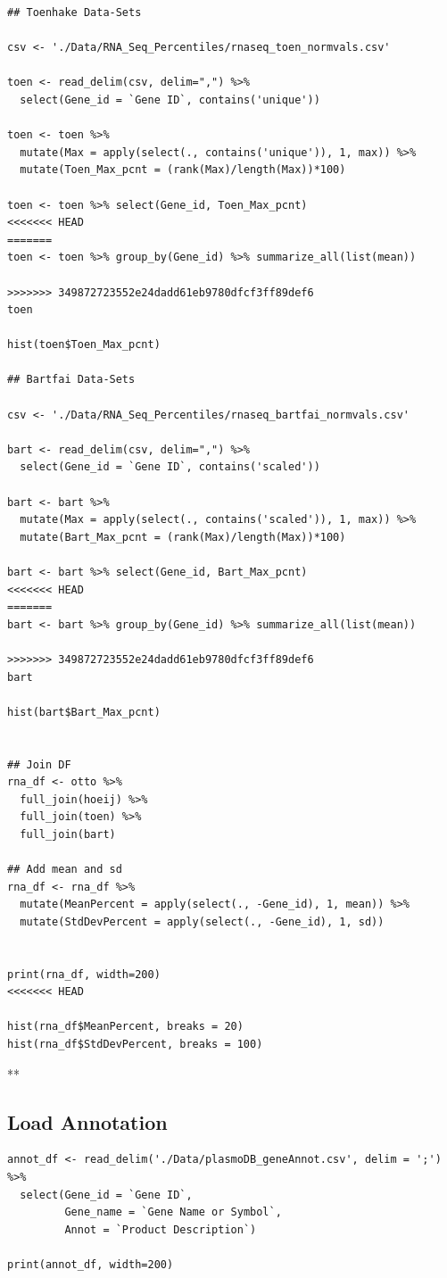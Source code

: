 \documentclass[11pt]{article}
\begin{document}
\begin{verbatim}
## Toenhake Data-Sets

csv <- './Data/RNA_Seq_Percentiles/rnaseq_toen_normvals.csv'

toen <- read_delim(csv, delim=",") %>%
  select(Gene_id = `Gene ID`, contains('unique'))

toen <- toen %>%
  mutate(Max = apply(select(., contains('unique')), 1, max)) %>%
  mutate(Toen_Max_pcnt = (rank(Max)/length(Max))*100)

toen <- toen %>% select(Gene_id, Toen_Max_pcnt)
<<<<<<< HEAD
=======
toen <- toen %>% group_by(Gene_id) %>% summarize_all(list(mean))

>>>>>>> 349872723552e24dadd61eb9780dfcf3ff89def6
toen

hist(toen$Toen_Max_pcnt)

## Bartfai Data-Sets

csv <- './Data/RNA_Seq_Percentiles/rnaseq_bartfai_normvals.csv'

bart <- read_delim(csv, delim=",") %>%
  select(Gene_id = `Gene ID`, contains('scaled'))

bart <- bart %>%
  mutate(Max = apply(select(., contains('scaled')), 1, max)) %>%
  mutate(Bart_Max_pcnt = (rank(Max)/length(Max))*100)

bart <- bart %>% select(Gene_id, Bart_Max_pcnt)
<<<<<<< HEAD
=======
bart <- bart %>% group_by(Gene_id) %>% summarize_all(list(mean))

>>>>>>> 349872723552e24dadd61eb9780dfcf3ff89def6
bart

hist(bart$Bart_Max_pcnt)


## Join DF
rna_df <- otto %>%
  full_join(hoeij) %>%
  full_join(toen) %>%
  full_join(bart)

## Add mean and sd
rna_df <- rna_df %>%
  mutate(MeanPercent = apply(select(., -Gene_id), 1, mean)) %>%
  mutate(StdDevPercent = apply(select(., -Gene_id), 1, sd))


print(rna_df, width=200)
<<<<<<< HEAD

hist(rna_df$MeanPercent, breaks = 20)
hist(rna_df$StdDevPercent, breaks = 100)
\end{verbatim}
**
\subsection{Load Annotation}
\label{sec:org905fb5c}
\begin{verbatim}
annot_df <- read_delim('./Data/plasmoDB_geneAnnot.csv', delim = ';') %>%
  select(Gene_id = `Gene ID`,
         Gene_name = `Gene Name or Symbol`,
         Annot = `Product Description`)

print(annot_df, width=200)
\end{verbatim}
\end{document}
